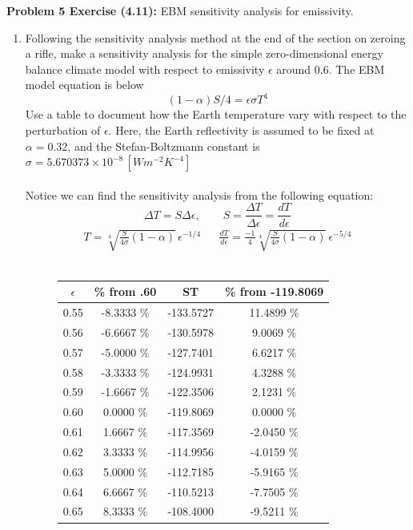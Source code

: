 \documentclass[11pt]{article}
\newenvironment{problem}[1]{\textbf{Problem #1: }}{\newpage}
\begin{document}
	\begin{problem}{5 Exercise (4.11)}
		EBM sensitivity analysis for emissivity.
		\begin{enumerate}[label = (\alph*)]
			\item Following the sensitivity analysis method at the end of the section on zeroing a
			rifle, make a sensitivity analysis for the simple zero-dimensional energy balance
			climate model with respect to emissivity $\epsilon$ around 0.6. The EBM model equation
			is below
			\[(1-\alpha)S/4 = \epsilon \sigma T^4\]
			Use a table to document how the Earth temperature vary with respect to the perturbation of $\epsilon$. Here, the Earth reflectivity is assumed to be fixed at $\alpha = 0.32$, and the Stefan-Boltzmann constant is $\sigma = 5.670373 \times 10^{-8}\,[Wm^{-2}K^{-4}] $
			\\ \\
			Notice we can find the sensitivity analysis from the following equation:
			\[\Delta T = S \Delta \epsilon, \qquad S = \frac{\Delta T}{\Delta \epsilon} = \frac{dT}{d\epsilon}\]
			\begin{align*}
				T = \sqrt[4]{\frac{S}{4\sigma}\left(1 - \alpha \right)}\,\epsilon^{-1/4} &&
				\frac{dT}{d\epsilon} = \frac{-1}{4}\sqrt[4]{\frac{S}{4\sigma}\left(1 - \alpha \right)}\,\epsilon^{-5/4}
			\end{align*}
			\\ 
			\begin{figure}[h!]
				\centering
				\begin{tabular}{|c|c|c|c|}
					\hline
					$\epsilon$ & \% from .60 & ST & \% from -119.8069\\
					\hline
					0.55  &  -8.3333 \%  &   -133.5727  &   11.4899 \% \\
					0.56  &  -6.6667 \%  &   -130.5978  &   9.0069 \% \\
					0.57  &  -5.0000 \%  &   -127.7401  &   6.6217 \% \\
					0.58  &  -3.3333 \%  &   -124.9931  &   4.3288 \% \\
					0.59  &  -1.6667 \%  &   -122.3506  &   2.1231 \% \\
					0.60  &   0.0000 \%  &   -119.8069  &   0.0000 \% \\
					0.61  &   1.6667 \%  &   -117.3569  &   -2.0450 \% \\
					0.62  &   3.3333 \%  &   -114.9956  &   -4.0159 \% \\
					0.63  &   5.0000 \%  &   -112.7185  &   -5.9165 \% \\
					0.64  &   6.6667 \%  &   -110.5213  &   -7.7505 \% \\
					0.65  &   8.3333 \%  &   -108.4000  &   -9.5211 \% \\
					\hline		
				\end{tabular}
			\end{figure}
			\newpage 


\end{enumerate}
\end{problem}
\end{document}
